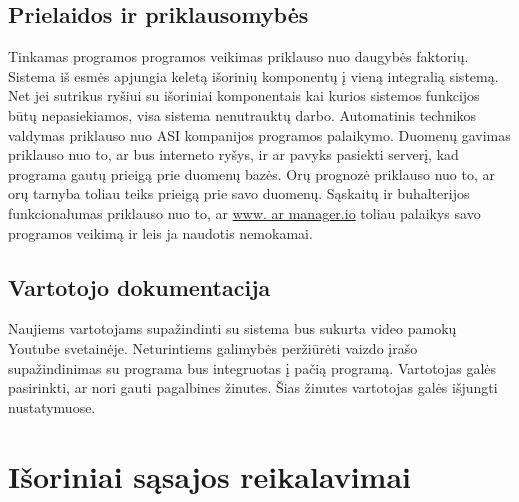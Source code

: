 \documentclass[oneside]{VUMIFPSkursinis}
\begin{document}
\subsection{Prielaidos ir priklausomybės}
Tinkamas programos programos veikimas priklauso nuo daugybės faktorių. Sistema iš esmės apjungia keletą išorinių komponentų į vieną integralią sistemą. Net jei sutrikus ryšiui su išoriniai komponentais kai kurios sistemos funkcijos būtų nepasiekiamos, visa sistema nenutrauktų darbo. Automatinis technikos valdymas priklauso nuo ASI kompanijos programos palaikymo. Duomenų gavimas priklauso nuo to, ar bus interneto ryšys, ir ar pavyks pasiekti serverį, kad programa gautų prieigą prie duomenų bazės. Orų prognozė priklauso nuo to, ar orų tarnyba toliau teiks prieigą prie savo duomenų. Sąskaitų ir buhalterijos funkcionalumas priklauso nuo to, ar \url{www. ar manager.io} toliau palaikys savo programos veikimą ir leis ja naudotis nemokamai.
\subsection{Vartotojo dokumentacija}
Naujiems vartotojams supažindinti su sistema bus sukurta video pamokų Youtube svetainėje. Neturintiems galimybės peržiūrėti vaizdo įrašo supažindinimas su programa bus integruotas į pačią programą. Vartotojas galės pasirinkti, ar nori gauti pagalbines žinutes. Šias žinutes vartotojas galės išjungti nustatymuose. 

\pagebreak

\section{Išoriniai sąsajos reikalavimai}
\end{document}
